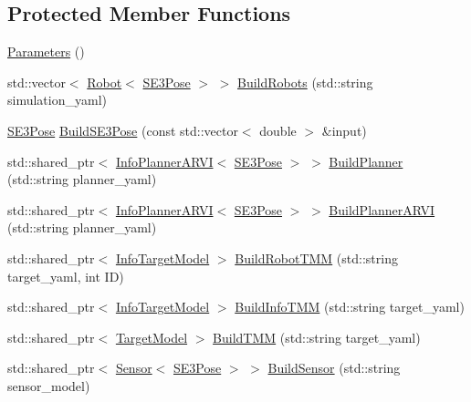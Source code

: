 \subsection*{Protected Member Functions}
\begin{DoxyCompactItemize}
\item 
\hyperlink{classnx_1_1Parameters_ac431c1270f5c5c689d3862ae73cb77eb}{Parameters} ()
\item 
std\+::vector$<$ \hyperlink{classnx_1_1Robot}{Robot}$<$ \hyperlink{structnx_1_1SE3Pose}{S\+E3\+Pose} $>$ $>$ \hyperlink{classnx_1_1Parameters_acc2af751ddee5fced21fe0f2d0a25023}{Build\+Robots} (std\+::string simulation\+\_\+yaml)
\item 
\hyperlink{structnx_1_1SE3Pose}{S\+E3\+Pose} \hyperlink{classnx_1_1Parameters_a554240e99a3763a48d2eba55a1e0eaa7}{Build\+S\+E3\+Pose} (const std\+::vector$<$ double $>$ \&input)
\item 
std\+::shared\+\_\+ptr$<$ \hyperlink{classnx_1_1InfoPlannerARVI}{Info\+Planner\+A\+R\+VI}$<$ \hyperlink{structnx_1_1SE3Pose}{S\+E3\+Pose} $>$ $>$ \hyperlink{classnx_1_1Parameters_a371e7560858548bc90e6e43f06a20ba2}{Build\+Planner} (std\+::string planner\+\_\+yaml)
\item 
std\+::shared\+\_\+ptr$<$ \hyperlink{classnx_1_1InfoPlannerARVI}{Info\+Planner\+A\+R\+VI}$<$ \hyperlink{structnx_1_1SE3Pose}{S\+E3\+Pose} $>$ $>$ \hyperlink{classnx_1_1Parameters_a1067b6207de6e2c4fe799c302bcd731b}{Build\+Planner\+A\+R\+VI} (std\+::string planner\+\_\+yaml)
\item 
std\+::shared\+\_\+ptr$<$ \hyperlink{classnx_1_1InfoTargetModel}{Info\+Target\+Model} $>$ \hyperlink{classnx_1_1Parameters_afcb2f37e60548d2c4b25382a8e1dd8a0}{Build\+Robot\+T\+MM} (std\+::string target\+\_\+yaml, int ID)
\item 
std\+::shared\+\_\+ptr$<$ \hyperlink{classnx_1_1InfoTargetModel}{Info\+Target\+Model} $>$ \hyperlink{classnx_1_1Parameters_a161d5a177f864d98b51cc4e517ba37d4}{Build\+Info\+T\+MM} (std\+::string target\+\_\+yaml)
\item 
std\+::shared\+\_\+ptr$<$ \hyperlink{classnx_1_1TargetModel}{Target\+Model} $>$ \hyperlink{classnx_1_1Parameters_acfbdaae76e98bc8379db6356d5f2078c}{Build\+T\+MM} (std\+::string target\+\_\+yaml)
\item 
std\+::shared\+\_\+ptr$<$ \hyperlink{classnx_1_1Sensor}{Sensor}$<$ \hyperlink{structnx_1_1SE3Pose}{S\+E3\+Pose} $>$ $>$ \hyperlink{classnx_1_1Parameters_a60075d8f0a4b34c7f60e7cf0992ed413}{Build\+Sensor} (std\+::string sensor\+\_\+model)
\item 

\end{DoxyCompactItemize}
